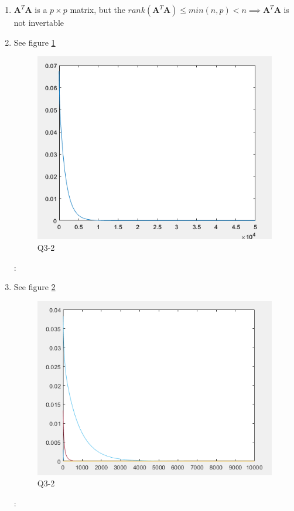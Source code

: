 \documentclass[11pt]{article}
\newcommand{\mfile}[1]  {{\small }} %
\newcommand{\mtx}[1]{\mathbf{#1}}
\def \mA {\mtx{A}}
\begin{document}
	\begin{enumerate}
		\item $\mA^T\mA$ is a $p\times p$ matrix, but the $rank(\mA^T\mA)\leq min(n,p) < n \implies \mA^T\mA$ is not invertable
		\item See figure \ref{fig:Q3_2} 
		\mfile{q3_2.m} 
		\begin{figure}[h!]
			\centering
			\includegraphics[width=0.5\linewidth]{q32.png}
			\caption{Q3-2}
			\label{fig:Q3_2}
		\end{figure}:

		\item See figure \ref{fig:Q3_3} 
		\mfile{q3_3.m} 
		\begin{figure}[h!]
			\centering
			\includegraphics[width=0.5\linewidth]{q3_3.png}
			\caption{Q3-2}
			\label{fig:Q3_3}
		\end{figure}:
	\end{enumerate}
	
\end{document}
